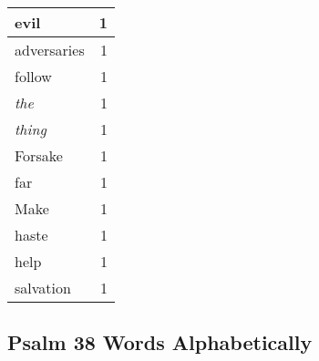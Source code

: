 \begin{center}
\begin{longtable}{l|r}
evil & 1\\ \hline 
adversaries & 1\\ \hline 
follow & 1\\ \hline 
\emph{the} & 1\\ \hline 
\emph{thing} & 1\\ \hline 
Forsake & 1\\ \hline 
far & 1\\ \hline 
Make & 1\\ \hline 
haste & 1\\ \hline 
help & 1\\ \hline 
salvation & 1\\ \hline 
\end{longtable}
\end{center}





\subsection{Psalm 38 Words Alphabetically}


\normalsize
 
